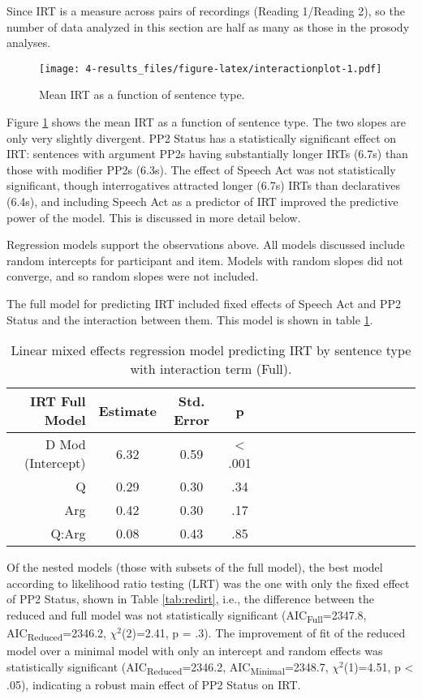 \documentclass[11pt,oneside]{book}
\begin{document}
Since IRT is a measure across pairs of recordings (Reading 1/Reading 2), so the number of data analyzed in this section are half as many as those in the prosody analyses.

\begin{figure}
\centering
\texttt{[image: 4-results\_files/figure-latex/interactionplot-1.pdf]}
\caption{\label{fig:interactionplot}Mean IRT as a function of sentence type.}
\end{figure}

Figure \ref{fig:interactionplot} shows the mean IRT as a function of sentence type. The two slopes are only very slightly divergent. PP2 Status has a statistically significant effect on IRT: sentences with argument PP2s having substantially longer IRTs (6.7s) than those with modifier PP2s (6.3s). The effect of Speech Act was not statistically significant, though interrogatives attracted longer (6.7s) IRTs than declaratives (6.4s), and including Speech Act as a predictor of IRT improved the predictive power of the model. This is discussed in more detail below.

Regression models support the observations above. All models discussed include random intercepts for participant and item. Models with random slopes did not converge, and so random slopes were not included.

The full model for predicting IRT included fixed effects of Speech Act and PP2 Status and the interaction between them. This model is shown in table \ref{tab:hyp}.

\begin{table}[!h]

\caption{\label{tab:hyp}Linear mixed effects regression model predicting IRT by sentence type with interaction term (Full).}
\centering
\begin{tabular}{rcccrcccrcccrccc}
\toprule
IRT Full Model & Estimate & Std. Error & p\\
\midrule
D Mod (Intercept) & 6.32 & 0.59 & < .001\\
Q & 0.29 & 0.30 & .34\\
Arg & 0.42 & 0.30 & .17\\
Q:Arg & 0.08 & 0.43 & .85\\
\bottomrule
\end{tabular}
\end{table}

Of the nested models (those with subsets of the full model), the best model according to likelihood ratio testing (LRT) was the one with only the fixed effect of PP2 Status, shown in Table \ref{tab:redirt}, i.e., the difference between the reduced and full model was not statistically significant (AIC\textsubscript{Full}=2347.8, AIC\textsubscript{Reduced}=2346.2, \(\chi^2\)(2)=2.41, p = .3). The improvement of fit of the reduced model over a minimal model with only an intercept and random effects was statistically significant (AIC\textsubscript{Reduced}=2346.2, AIC\textsubscript{Minimal}=2348.7, \(\chi^2\)(1)=4.51, p \textless{} .05), indicating a robust main effect of PP2 Status on IRT.
\end{document}
